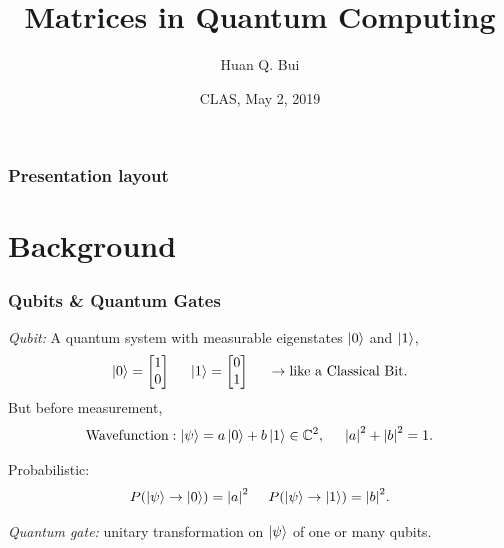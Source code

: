 \documentclass{beamer}
\title{Matrices in Quantum Computing}
\author[Huan Q. Bui] %
{Huan Q. Bui}
\institute[Colby College] %
{
	
	Matrix Analysis
	\and
	Professor Leo Livshits
}
\date{CLAS, May 2, 2019}
\theoremstyle{definition}
\begin{document}
 
\frame{\titlepage}
 
\begin{frame}
\frametitle{Presentation layout}
\tableofcontents
\end{frame}



\section{Background}



\begin{frame}
\frametitle{Qubits \& Quantum Gates}
\textit{Qubit:} A quantum system with measurable eigenstates $\left\vert{0}\right\rangle$ and $\left\vert{1}\right\rangle$,
\begin{align*}
\left\vert{0}\right\rangle = \begin{bmatrix}
1\\0
\end{bmatrix}\hspace{0.5cm} \left\vert{1}\right\rangle = \begin{bmatrix}
0\\1
\end{bmatrix} \hspace{0.5cm} \rightarrow \text{like a Classical Bit.}
\end{align*}
But before measurement,
\begin{align*}
\text{Wavefunction}: \left\vert{\psi}\right\rangle = a\left\vert{0}\right\rangle + b\left\vert{1}\right\rangle \in \mathbb{C}^2,\hspace{0.5cm} \abs{a}^2 + \abs{b}^2 = 1.
\end{align*}

Probabilistic:
\begin{align*}
P(\left\vert{\psi}\right\rangle \to \left\vert{0}\right\rangle) = \abs{a}^2\hspace{0.5cm}
P(\left\vert{\psi}\right\rangle \to \left\vert{1}\right\rangle) = \abs{b}^2.
\end{align*}

\textit{Quantum gate:} unitary transformation on $\left\vert{\psi}\right\rangle$ of one or many qubits. 
\end{frame}
\end{document}
